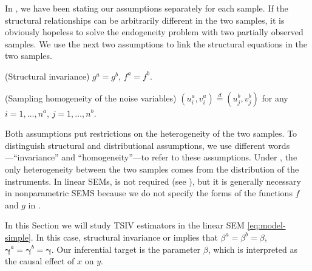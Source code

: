 \documentclass[preprint]{imsart}
\begin{document}


In , we have been
stating our assumptions separately for each sample. If the
structural relationships can be arbitrarily different in the two
samples, it is obviously hopeless to solve the endogeneity problem
with two partially observed samples. We use the next two assumptions to
link the structural equations in the two samples.

\begin{assumption} \label{assump:invariance}
  (Structural invariance) $g^a = g^b$, $f^a = f^b$.
\end{assumption}

\begin{assumption} \label{assump:invariance-noise}
  (Sampling homogeneity of the noise variables) $(u_i^a,v_i^a) \overset{d}{=}
  (u_j^b,v_j^b)$ for any $i=1,\dotsc,n^a$, $j=1,\dotsc,n^b$.
\end{assumption}

Both assumptions put restrictions on the heterogeneity of the two
samples. To distinguish structural and distributional assumptions,
we use different words---``invariance'' and ``homogeneity''---to refer
to these assumptions. Under
, the only
heterogeneity between the two samples comes from the distribution of
the instruments.
In linear SEMs,  is not
required (see ), but it is generally
necessary in nonparametric SEMS because we do not specify the forms of the
functions $f$ and $g$ in .

In this Section we will study TSIV estimators in the linear SEM
\eqref{eq:model-simple}. In this case, structural invariance
or  implies
that $\beta^a = \beta^b = \beta$, $\bm{\gamma}^a = \bm{\gamma}^b =
\bm{\gamma}$. Our inferential target is the parameter
$\beta$, which is interpreted as the causal effect of $x$ on $y$.
\end{document}
